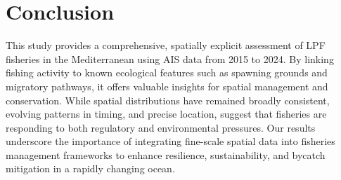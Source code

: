 \chapter{Conclusion}

This study provides a comprehensive, spatially explicit assessment of LPF fisheries in the
Mediterranean using AIS data from 2015 to 2024. By linking fishing activity to known ecological
features such as spawning grounds and migratory pathways, it offers valuable insights for spatial
management and conservation. While spatial distributions have remained broadly consistent, evolving
patterns in timing, and precise location, suggest that fisheries are responding to both regulatory
and environmental pressures. Our results underscore the importance of integrating fine-scale
spatial data into fisheries management frameworks to enhance resilience, sustainability, and
bycatch mitigation in a rapidly changing ocean.